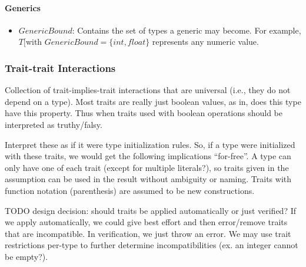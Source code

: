 \documentclass{article}
\begin{document}
\paragraph{Generics}
\begin{itemize}
    \item $GenericBound$: Contains the set of types a generic may become. For example, $T[$with $GenericBound=\{int, float\}$ represents any numeric value.
\end{itemize}



\subsubsection{Trait-trait Interactions}
Collection of trait-implies-trait interactions that are universal (i.e., they do not depend on a type). Most traits are really just boolean values, as in, does this type have this property. Thus when traits used with boolean operations should be interpreted as truthy/falsy.

Interpret these as if it were type initialization rules. So, if a type were initialized with these traits, we would get the following implications ``for-free''. A type can only have one of each trait (except for multiple literals?), so traits given in the assumption can be used in the result without ambiguity or naming. Traits with function notation (parenthesis) are assumed to be new constructions.

TODO design decision: should traits be applied automatically or just verified? If we apply automatically, we could give best effort and then error/remove traits that are incompatible. In verification, we just throw an error. We may use trait restrictions per-type to further determine incompatibilities (ex. an integer cannot be empty?).
\end{document}

